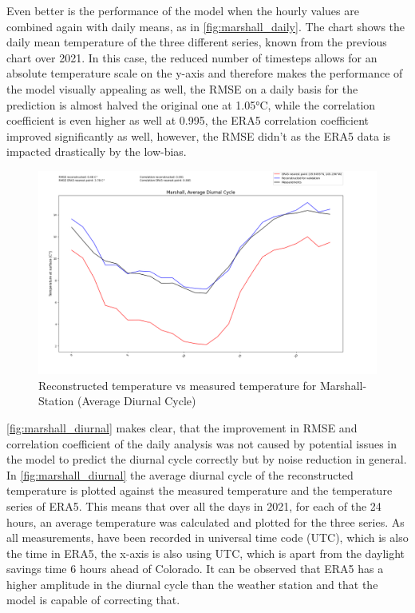 Even better is the performance of the model when the hourly values are combined again with daily means, as in \autoref{fig:marshall_daily}. The chart shows the daily mean temperature of the three different series, known from the previous chart over 2021. In this case, the reduced number of timesteps allows for an absolute temperature scale on the y-axis and therefore makes the performance of the model visually appealing as well, the RMSE on a daily basis for the prediction is almost halved the original one at 1.05°C, while the correlation coefficient is even higher as well at 0.995, the ERA5 correlation coefficient improved significantly as well, however, the RMSE didn't as the ERA5 data is impacted drastically by the low-bias.

\begin{figure}
    \centering
    \includegraphics[width=\textwidth]{resources/images/charts/marshall_eval_grib_final/Marshall, Average Diurnal Cycle.png}
    \caption{Reconstructed temperature vs measured temperature for Marshall-Station (Average Diurnal Cycle)}
    \label{fig:marshall_diurnal}
\end{figure}

\autoref{fig:marshall_diurnal} makes clear, that the improvement in RMSE and correlation coefficient of the daily analysis was not caused by potential issues in the model to predict the diurnal cycle correctly but by noise reduction in general. In \autoref{fig:marshall_diurnal} the average diurnal cycle of the reconstructed temperature is plotted against the measured temperature and the temperature series of ERA5. This means that over all the days in 2021, for each of the 24 hours, an average temperature was calculated and plotted for the three series. As all measurements, have been recorded in universal time code (UTC), which is also the time in ERA5, the x-axis is also using UTC, which is apart from the daylight savings time 6 hours ahead of Colorado. It can be observed that ERA5 has a higher amplitude in the diurnal cycle than the weather station and that the model is capable of correcting that.


